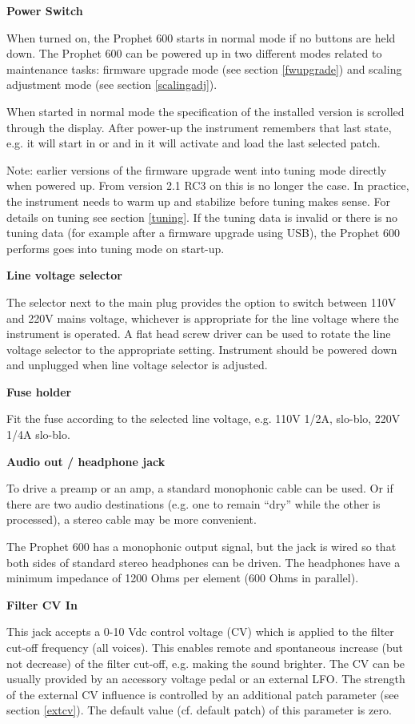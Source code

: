\textbf{Power Switch}

When turned on, the Prophet 600 starts in normal mode if no buttons are held down. The Prophet 600 can be powered up in two different modes related to maintenance tasks: firmware upgrade mode (see section \ref{fwupgrade}) and scaling adjustment mode (see section \ref{scalingadj}).  

When started in normal mode the specification of the installed version is scrolled through the display. After power-up the instrument remembers that last state, e.g. it will start in \livemode or \presetmode and in \presetmode it will activate and load the last selected patch.

Note: earlier versions of the firmware upgrade went into tuning mode directly when powered up. From version 2.1 RC3 on this is no longer the case. In practice, the instrument needs to warm up and stabilize before tuning makes sense. For details on tuning see section \ref{tuning}. If the tuning data is invalid or there is no tuning data (for example after a firmware upgrade using USB), the Prophet 600 performs goes into tuning mode on start-up.

\textbf{Line voltage selector}

The selector next to the main plug provides the option to switch between 110V and 220V mains voltage, whichever is appropriate for the line voltage where the instrument is operated. A flat head screw driver can be used to rotate the line voltage selector to the appropriate setting. Instrument should be powered down and unplugged when line voltage selector is adjusted.

\textbf{Fuse holder}

Fit the fuse according to the selected line voltage, e.g. 110V 1/2A, slo-blo, 220V 1/4A slo-blo.

\textbf{Audio out / headphone jack}

To drive a preamp or an amp, a standard monophonic cable can be used. Or if there are two audio destinations (e.g. one to remain “dry” while the other is processed), a stereo cable may be more convenient.

The Prophet 600 has a monophonic output signal, but the jack is wired so that both sides of standard stereo headphones can be driven. The headphones have a minimum impedance of 1200 Ohms per element (600 Ohms in parallel).

\textbf{Filter CV In}

This jack accepts a 0-10 Vdc control voltage (CV) which is applied to the filter cut-off frequency (all voices). This enables remote and spontaneous increase (but not decrease) of the filter cut-off, e.g. making the sound brighter. The CV can be usually provided by an accessory voltage pedal or an external LFO. The strength of the external CV influence is controlled by an additional patch parameter (see section \ref{extcv}). The default value (cf. default patch) of this parameter is zero. 

